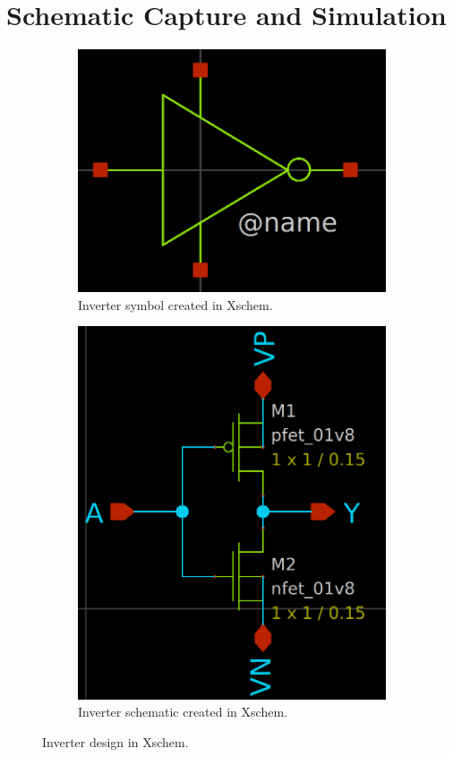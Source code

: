 \documentclass[11pt]{article}
\begin{document}
\section{Schematic Capture and Simulation}
    \begin{figure}[!ht]
        \begin{subfigure}{0.5\linewidth}
            \includegraphics[width=\linewidth]{inverter_sym.png}
            \caption{Inverter symbol created in Xschem.}
        \end{subfigure}
        \begin{subfigure}{0.5\linewidth}
            \includegraphics[width=\linewidth]{inverter_sch.png}
            \caption{Inverter schematic created in Xschem.}
        \end{subfigure}
        \caption{Inverter design in Xschem.}
        \label{fig:inv}
    \end{figure}
\end{document}
